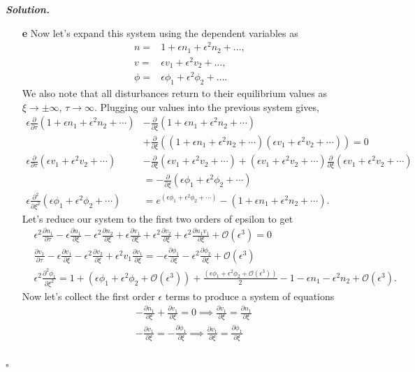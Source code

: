 \documentclass[12pt]{report}
\newenvironment{solution}[1][\it{Solution}]{\textbf{#1. } }{$\square$}
\def\eps{{\epsilon}}
\def\O{{\mathcal{O}}}
\newcommand{\paren}[1]{{\left(#1\right)}} %
\newcommand{\pp}[2]{\frac{\partial #1}{\partial #2}} %
\newcommand{\ppn}[3]{\frac{\partial^{#1} #2}{\partial #3^{#1}}} %
\begin{document}
\begin{solution}
\begin{enumerate}
    \item[{\bf e}] Now let's expand this system using the dependent variables as 
    \begin{align*}
        n=&1+\epsilon n_1+\epsilon^2 n_2+\ldots, \\
        v=&\epsilon v_1+\epsilon^2 v_2+\ldots, \\
        \phi=&\epsilon \phi_1+\epsilon^2 \phi_2+\ldots.
    \end{align*}
    We also note that all disturbances return to their equilibrium values as $\xi\rightarrow \pm \infty$, $\tau \rightarrow \infty$. Plugging our values into the previous system gives,
    \begin{align*}
        \eps \pp{}{\tau}(1 + \eps n_1 + \eps^2 n_2 + \cdots) &- \pp{}{\xi}(1 + \eps n_1 + \eps^2 n_2 + \cdots)\\ &+ \pp{}{\xi}\paren{(1 + \eps n_1 + \eps^2 n_2 + \cdots)(\eps v_1 + \eps^2 v_2 + \cdots)} = 0\\
        \eps \pp{}{\tau}(\eps v_1 + \eps^2 v_2 + \cdots) &- \pp{}{\xi}(\eps v_1 + \eps^2 v_2 + \cdots) + (\eps v_1 + \eps^2 v_2 + \cdots)\pp{}{\xi}(\eps v_1 + \eps^2 v_2 + \cdots)\\
        &= -\pp{}{\xi}(\eps \phi_1 + \eps^2 \phi_2 + \cdots)\\
        \eps \ppn{2}{}{\xi}(\eps \phi_1 + \eps^2 \phi_2 + \cdots) &= e^{(\eps \phi_1 + \eps^2 \phi_2 + \cdots)} - (1 + \eps n_1 + \eps^2 n_2 + \cdots).
    \end{align*}
    Let's reduce our system to the first two orders of epsilon to get
    \begin{align*}
        &\eps^2 \pp{n_1}{\tau} - \eps \pp{n_1}{\xi} - \eps^2\pp{n_2}{\xi} + \eps \pp{v_1}{\xi} + \eps^2 \pp{v_2}{\xi} + \eps^2 \pp{n_1v_1}{\xi} + \O(\eps^3) = 0\\
        &\pp{v_1}{\tau} - \eps \pp{v_1}{\xi} - \eps^2 \pp{v_2}{\xi} + \eps^2 v_1 \pp{v_1}{\xi} = -\eps\pp{\phi_1}{\xi} - \eps^2\pp{\phi_2}{\xi} + \O(\eps^3)\\
        &\eps^2 \ppn{2}{\phi_1}{\xi} = 1 + (\eps \phi_1 + \eps^2\phi_2 + \O(\eps^3)) + \frac{(\eps \phi_1 + \eps^2\phi_2 + \O(\eps^3))}{2} - 1 - \eps n_1 - \eps^2 n_2 + \O(\eps^3).
    \end{align*}
    Now let's collect the first order $\eps$ terms to produce a system of equations
    \begin{align*}
        &-\pp{n_1}{\xi} + \pp{v_1}{\xi} = 0 \implies \pp{v_1}{\xi} = \pp{n_1}{\xi} \\
        &-\pp{v_1}{\xi} = -\pp{\phi_1}{\xi} \implies \pp{v_1}{\xi} = \pp{\phi_1}{\xi}\\

\end{align*}
\end{enumerate}
\end{solution}
\end{document}
